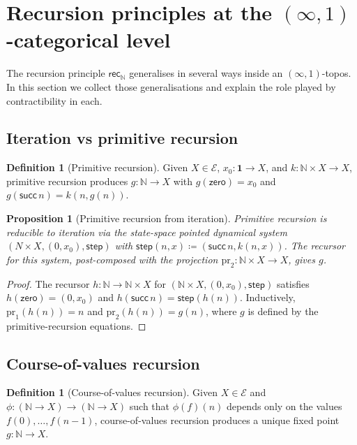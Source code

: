 \documentclass[12pt]{article}
\newtheorem{proposition}[theorem]{Proposition}
\theoremstyle{definition}
\newtheorem{definition}[theorem]{Definition}
\theoremstyle{remark}
\newcommand{\N}{\mathbb{N}}
\newcommand{\zero}{\mathsf{zero}}
\newcommand{\suc}{\mathsf{succ}}
\newcommand{\rec}{\mathsf{rec}}
\begin{document}
\section{Recursion principles at the \texorpdfstring{$(\infty,1)$}{(infinity,1)}-categorical level}\label{sec:recursion}

The recursion principle $\rec_{\N}$ generalises in several ways inside an $(\infty,1)$-topos. In this section we collect those generalisations and explain the role played by contractibility in each.

\subsection{Iteration vs primitive recursion}

\begin{definition}[Primitive recursion]
Given $X\in\mathcal{E}$, $x_{0}\colon\mathbf{1}\to X$, and $k\colon \N\times X\to X$, primitive recursion produces $g\colon\N\to X$ with $g(\zero)=x_{0}$ and $g(\suc\,n)=k(n,g(n))$.
\end{definition}

\begin{proposition}[Primitive recursion from iteration]\label{prop:prim-rec}
Primitive recursion is reducible to iteration via the state-space pointed dynamical system $(N\times X, (0,x_{0}), \mathsf{step})$ with $\mathsf{step}(n,x)\coloneqq (\suc\,n, k(n,x))$. The recursor for this system, post-composed with the projection $\mathrm{pr}_{2}\colon \N\times X\to X$, gives $g$.
\end{proposition}

\begin{proof}
The recursor $h\colon \N\to \N\times X$ for $(\N\times X,(0,x_{0}),\mathsf{step})$ satisfies $h(\zero)=(0,x_{0})$ and $h(\suc\,n)=\mathsf{step}(h(n))$. Inductively, $\mathrm{pr}_{1}(h(n))=n$ and $\mathrm{pr}_{2}(h(n))=g(n)$, where $g$ is defined by the primitive-recursion equations.
\end{proof}

\subsection{Course-of-values recursion}

\begin{definition}[Course-of-values recursion]
Given $X\in\mathcal{E}$ and $\phi\colon (\N\to X)\to (\N\to X)$ such that $\phi(f)(n)$ depends only on the values $f(0),\ldots,f(n-1)$, course-of-values recursion produces a unique fixed point $g\colon\N\to X$.
\end{definition}
\end{document}
